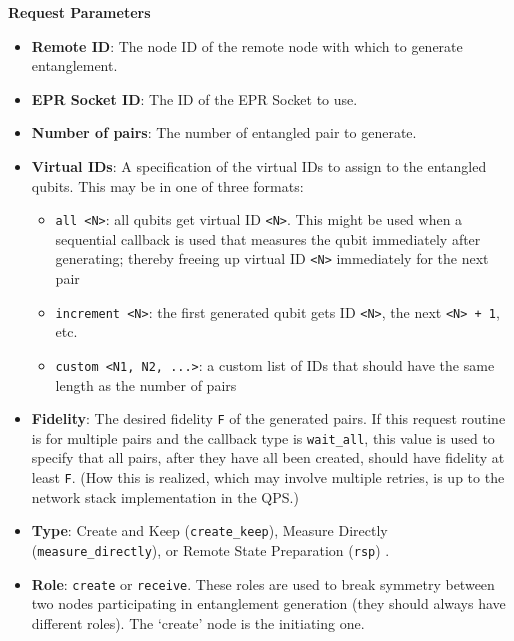 \textbf{Request Parameters}
\begin{itemize}
\item \textbf{Remote ID}: The node ID of the remote node with which to generate entanglement.
\item \textbf{EPR Socket ID}: The ID of the EPR Socket to use.
\item \textbf{Number of pairs}: The number of entangled pair to generate.
\item \textbf{Virtual IDs}: A specification of the virtual IDs to assign to the entangled qubits. This may be in one of three formats:
\begin{itemize}
  \item \texttt{all <N>}: all qubits get virtual ID \texttt{<N>}. This might be used when a sequential callback is used that measures the qubit immediately after generating; thereby freeing up virtual ID \texttt{<N>} immediately for the next pair
  \item \texttt{increment <N>}: the first generated qubit gets ID \texttt{<N>}, the next \texttt{<N> + 1}, etc.
  \item \texttt{custom <N1, N2, ...>}: a custom list of IDs that should have the same length as the number of pairs
\end{itemize}
\item \textbf{Fidelity}: The desired fidelity \texttt{F} of the generated pairs.
If this request routine is for multiple pairs and the callback type is \texttt{wait\_all}, this value is used to specify that all pairs, after they have all been created, should have fidelity at least \texttt{F}. (How this is realized, which may involve multiple retries, is up to the network stack implementation in the QPS.)
\item \textbf{Type}: Create and Keep (\texttt{create\_keep}), Measure Directly (\texttt{measure\_directly}), or Remote State Preparation (\texttt{rsp}) \cite{dahlberg2019link}.
\item \textbf{Role}: \texttt{create} or \texttt{receive}. These roles are used to break symmetry between two nodes participating in entanglement generation (they should always have different roles). The `create' node is the initiating one.

\end{itemize}




